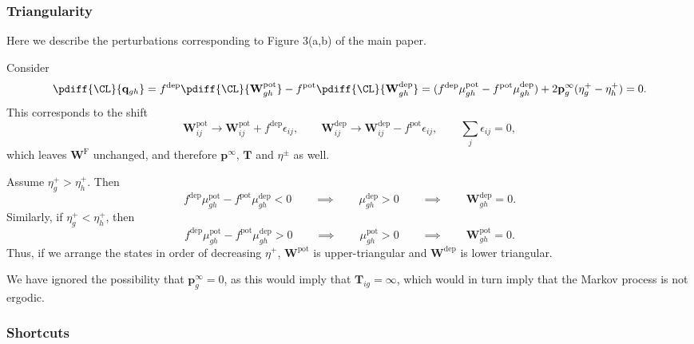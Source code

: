 \documentclass{article} %
\newcommand{\pr}{\mathbf{p}}
\newcommand{\eq}{\pr^\infty}
\newcommand{\fpt}{\mathbf{T}}
\newcommand{\W}{\mathbf{W}}
\newcommand{\enc}{\mathbf{q}}
\newcommand{\frg}{\W^{\mathrm{F}}}
\newcommand{\pot}{^{\text{pot}}}
\newcommand{\dep}{^{\text{dep}}}
\newcommand{\potdep}{^{\text{pot/dep}}}
\begin{document}
\subsubsection{Triangularity}\label{sec:triangular}

Here we describe the perturbations corresponding to Figure 3(a,b) of the main paper.

Consider
%
\begin{equation}\label{eq:shiftqderiv}
  \pdiff{\CL}{\enc_{gh}} =
  f\dep  \pdiff{\CL}{\W\pot _{gh}} - f\pot  \pdiff{\CL}{\W\dep _{gh}}
   = (f\dep  \mu\pot _{gh} - f\pot  \mu\dep _{gh}) + 2\eq_g (\eta^+_g - \eta^+_h)
   = 0.
\end{equation}
%
This corresponds to the shift
%
\begin{equation}\label{eq:shiftq}
  \W\pot _{ij} \to \W\pot _{ij} + f\dep \epsilon_{ij},
  \qquad
  \W\dep _{ij} \to \W\dep _{ij} - f\pot \epsilon_{ij},
  \qquad
  \sum_j \epsilon_{ij} = 0,
\end{equation}
%
which leaves $\frg$ unchanged, and therefore $\eq$, $\fpt$ and $\eta^\pm$ as well.

Assume $\eta^+_g > \eta^+_h$. Then
%
\begin{equation}\label{eq:lowertriangular}
 f\dep  \mu\pot _{gh} - f\pot  \mu\dep _{gh} <0
 \qquad\implies\qquad
 \mu\dep _{gh} >0
 \qquad\implies\qquad
 \W\dep _{gh}=0.
\end{equation}
%
Similarly, if $\eta^+_g < \eta^+_h$, then
%
\begin{equation}\label{eq:uppertriangular}
 f\dep  \mu\pot _{gh} - f\pot  \mu\dep _{gh} > 0
 \qquad\implies\qquad
 \mu\pot _{gh} >0
 \qquad\implies\qquad
 \W\pot _{gh}=0.
\end{equation}
%
Thus, if we arrange the states in order of decreasing $\eta^+$, $\W\pot $ is upper-triangular and $\W\dep $ is lower triangular.

We have ignored the possibility that $\eq_g=0$, as this would imply that $\fpt_{ig}=\infty$, which would in turn imply that the Markov process is not ergodic.


\subsubsection{Shortcuts}\label{sec:shortcuts}
\end{document}
